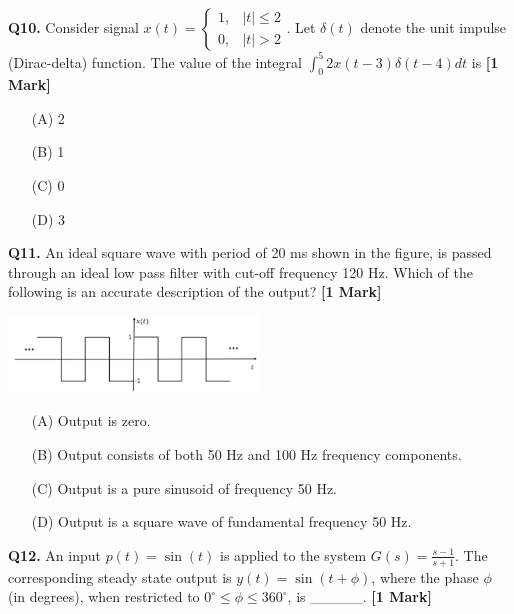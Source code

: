 \documentclass[11pt]{article}
\newcommand{\questiona}[2]{
    \noindent\textbf{Q#2.} #1 \hfill \textbf{[1 Mark]}
}
\begin{document}
\questiona{Consider signal \(x(t) = \begin{cases} 1, & |t| \leq 2 \\ 0, & |t| > 2 \end{cases}\). Let \(\delta(t)\) denote the unit impulse (Dirac-delta) function. The value of the integral \(\int_0^5 2x(t - 3)\delta(t - 4)dt\) is}{10}
\begin{enumerate}
    \item[(A)] 2
    \item[(B)] 1
    \item[(C)] 0
    \item[(D)] 3
\end{enumerate}
\vspace{0.5cm}

\questiona{An ideal square wave with period of 20 ms shown in the figure, is passed through an ideal low pass filter with cut-off frequency 120 Hz. Which of the following is an accurate description of the output?}{11}
\begin{center}
\includegraphics[width=0.5\textwidth]{figures/11.png}
\end{center}
\begin{enumerate}
    \item[(A)] Output is zero.
    \item[(B)] Output consists of both 50 Hz and 100 Hz frequency components.
    \item[(C)] Output is a pure sinusoid of frequency 50 Hz.
    \item[(D)] Output is a square wave of fundamental frequency 50 Hz.
\end{enumerate}
\vspace{0.5cm}

\questiona{An input \(p(t) = \sin(t)\) is applied to the system \(G(s) = \frac{s - 1}{s + 1}\). The corresponding steady state output is \(y(t) = \sin(t + \phi)\), where the phase \(\phi\) (in degrees), when restricted to \(0^\circ \leq \phi \leq 360^\circ\), is \_\_\_\_\_.}{12}
\vspace{0.5cm}
\end{document}
